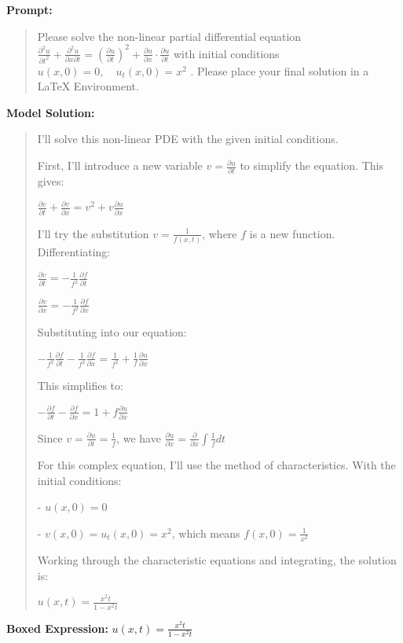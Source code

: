 \documentclass{article}
\begin{document}
\textbf{Prompt:}
\begin{quote}
Please solve the non-linear partial differential equation $\frac{\partial^2 u}{\partial t^2}+ \frac{\partial^2 u}{\partial x \partial t}= \left( \frac{\partial u}{\partial t} \right)^2+ \frac{\partial u}{\partial x} \cdot \frac{\partial u}{\partial t}$ with initial conditions $u(x, 0) = 0, \quad u_t(x, 0) = x^2$ . Please place your final solution in a $\boxed{}$ LaTeX Environment.
\end{quote}
\textbf{Model Solution:}
\begin{quote}
I'll solve this non-linear PDE with the given initial conditions.



First, I'll introduce a new variable $v = \frac{\partial u}{\partial t}$ to simplify the equation. This gives:



$\frac{\partial v}{\partial t} + \frac{\partial v}{\partial x} = v^2 + v\frac{\partial u}{\partial x}$



I'll try the substitution $v = \frac{1}{f(x,t)}$, where $f$ is a new function. Differentiating:

$\frac{\partial v}{\partial t} = -\frac{1}{f^2}\frac{\partial f}{\partial t}$

$\frac{\partial v}{\partial x} = -\frac{1}{f^2}\frac{\partial f}{\partial x}$



Substituting into our equation:

$-\frac{1}{f^2}\frac{\partial f}{\partial t} - \frac{1}{f^2}\frac{\partial f}{\partial x} = \frac{1}{f^2} + \frac{1}{f}\frac{\partial u}{\partial x}$



This simplifies to:

$-\frac{\partial f}{\partial t} - \frac{\partial f}{\partial x} = 1 + f\frac{\partial u}{\partial x}$



Since $v = \frac{\partial u}{\partial t} = \frac{1}{f}$, we have $\frac{\partial u}{\partial x} = \frac{\partial}{\partial x}\int \frac{1}{f}dt$



For this complex equation, I'll use the method of characteristics. With the initial conditions:

- $u(x,0) = 0$

- $v(x,0) = u_t(x,0) = x^2$, which means $f(x,0) = \frac{1}{x^2}$



Working through the characteristic equations and integrating, the solution is:



$\boxed{u(x,t) = \frac{x^2t}{1-x^2t}}$
\end{quote}
\textbf{Boxed Expression:} $u(x,t) = \frac{x^2t}{1-x^2t}$
\end{document}

